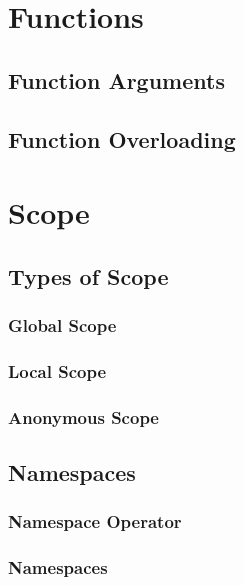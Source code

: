 \documentclass{article}
\title{\thistitle}
\author{\me}
\date{\today}
\begin{document}
\maketitle
\tableofcontents
\pagebreak

\section{Functions}

\subsection{Function Arguments}

\subsection{Function Overloading}

\section{Scope}

\subsection{Types of Scope}

\subsubsection{Global Scope}

\subsubsection{Local Scope}

\subsubsection{Anonymous Scope}

\subsection{Namespaces}

\subsubsection{Namespace Operator \inlinecpp{::}}

\subsubsection{ Namespaces}
\end{document}
